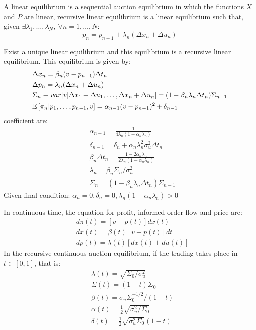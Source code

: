 A linear equilibrium is a sequential auction equilibrium in which the functions $X$ and $P$ are linear, recursive linear equilibrium is a linear equilibrium such that, given $\exists \lambda_1,\ldots, \lambda_N, \ \forall n = 1,\ldots,N$:
\begin{equation}
	p_n = p_{n-1} + \lambda_n(\Delta x_n + \Delta u_n)
\end{equation}
\newpage
\begin{mytheorem}
	Exist a unique linear equilibrium and this equilibrium is a recursive linear equilibrium. This equilibrium is given by:
	\begin{align*}
		&\Delta x_n = \beta_n(v - p_{n-1}) \Delta t_n \\
		&\Delta p_n = \lambda_n(\Delta x_n + \Delta u_n) \\
		& \Sigma_n \equiv var[v| \Delta x_1 + \Delta u_1,\ldots,\Delta x_n + \Delta u_n] = (1- \beta_n \lambda_n \Delta t_n)\Sigma_{n-1}\\
		& \mathbb{E}\left[\pi_n|p_1,\ldots,p_{n-1},v\right] = \alpha_{n-1}(v - p_{n-1})^2 + \delta_{n-1}
	\end{align*}
coefficient are:
\begin{align*}
	& \alpha_{n-1} = \frac{1}{4 \lambda_n (1 - \alpha_n \lambda_n)}\\
	& \delta_{n-1} = \delta_n + \alpha_n \lambda^2_n \sigma^2_u \Delta t_n \\
	& \beta_n \Delta t_n = \frac{1 - 2\alpha_n \lambda_n}{2 \lambda_n (1 - \alpha_n \lambda_n)} \\
	& \lambda_n = \beta_n \Sigma_n / \sigma^2_u \\
	& \Sigma_n = (1 - \beta_n\lambda_n\Delta t_n)\Sigma_{n-1}
\end{align*}
Given final condition: $\alpha_n = 0, \delta_n = 0, \lambda_n(1-\alpha_n\lambda_n)>0$
\end{mytheorem}
\begin{mytheorem}
In continuous time, the equation for profit, informed order flow and price are:
\begin{align*}
	& d\pi(t) = [v-p(t)]dx(t) \\
	& dx(t) = \beta(t)[v - p(t)]dt\\
	& dp(t) = \lambda(t)[dx(t) + du(t)]
\end{align*}
In the recursive continuous auction equilibrium, if the trading takes place in $t \in [0,1]$, that is:
\begin{align*}
	&\lambda(t) = \sqrt{\Sigma_0 / \sigma_u^2} \\
	& \Sigma(t) = (1-t)\Sigma_0 \\
	& \beta(t) = \sigma_u \Sigma_0^{-1/2} / (1-t)\\
	& \alpha(t) = \frac{1}{2}\sqrt{\sigma_u^2/ \Sigma_0}\\
	& \delta(t) = \frac{1}{2}\sqrt{\sigma_u^2\Sigma_0}(1-t)
\end{align*}
\end{mytheorem}
